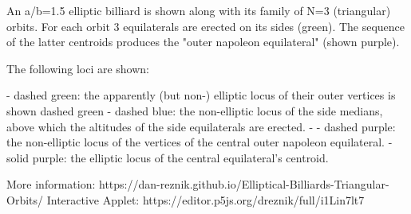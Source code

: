 An a/b=1.5 elliptic billiard is shown along with its family of N=3 (triangular) orbits. For each orbit 3 equilaterals are erected on its sides (green). The sequence of the latter centroids produces the "outer napoleon equilateral" (shown purple).

The following loci are shown:

- dashed green: the apparently (but non-) elliptic locus of their outer vertices is shown dashed green
- dashed blue: the non-elliptic locus of the side medians, above which the altitudes of the side equilaterals are erected. - 
- dashed purple: the non-elliptic locus of the vertices of the central outer napoleon equilateral.
- solid purple: the elliptic locus of the central equilateral's centroid.

More information: https://dan-reznik.github.io/Elliptical-Billiards-Triangular-Orbits/
Interactive Applet: https://editor.p5js.org/dreznik/full/i1Lin7lt7
